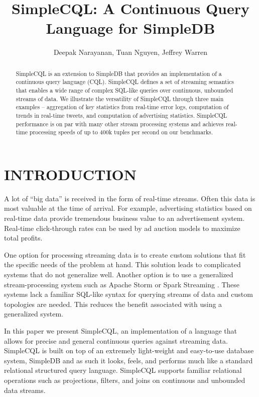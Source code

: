 \documentclass[a4paper, 10pt, conference]{IEEEconf}
\title{\LARGE \bf
SimpleCQL: A Continuous Query Language for SimpleDB
}
\author{Deepak Narayanan, Tuan Nguyen, Jeffrey Warren}
\begin{document}
\maketitle
\thispagestyle{empty}
\pagestyle{empty}


\begin{abstract}

SimpleCQL is an extension to SimpleDB \cite{simpledb} that provides an implementation of a continuous query language (CQL). SimpleCQL defines a set of streaming semantics that enables a wide range of complex SQL-like queries over continuous, unbounded streams of data.  We illustrate the versatility of SimpleCQL through three main examples -- aggregation of key statistics from real-time error logs, computation of trends in real-time tweets, and computation of advertising statistics.  SimpleCQL performance is on par with many other stream processing systems and achieves real-time processing speeds of up to 400k tuples per second on our benchmarks.

\end{abstract}


\section{INTRODUCTION}

A lot of “big data” is received in the form of real-time streams.  Often this data is most valuable at the time of arrival. For example, advertising statistics based on real-time data provide tremendous business value to an advertisement system. Real-time click-through rates can be used by ad auction models to maximize total profits.  

One option for processing streaming data is to create custom solutions that fit the specific needs of the problem at hand.  This solution leads to complicated systems that do not generalize well.  Another option is to use a generalized stream-processing system such as Apache Storm \cite{storm} or Spark Streaming \cite{spark_streaming}.  These systems lack a familiar SQL-like syntax for querying streams of data and custom topologies are needed.  This reduces the benefit associated with using a generalized system.

In this paper we present SimpleCQL, an implementation of a language that allows for precise and general continuous queries against streaming data.  SimpleCQL is built on top of an extremely light-weight and easy-to-use database system, SimpleDB and as such it looks, feels, and performs much like a standard relational structured query language. SimpleCQL supports  familiar relational operations such as projections, filters, and joins on continuous and unbounded data streams.
\end{document}
